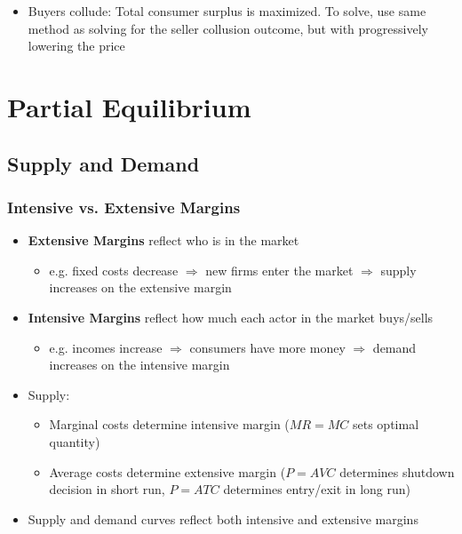 \documentclass{article}
\newcommand{\blue}[1]{{\color{blue}#1}}
\begin{document}
\begin{itemize}
\begin{itemize}
			\item Buyers collude: Total consumer surplus is maximized. To solve, use same method as solving for the seller collusion outcome, but with progressively lowering the price
		\end{itemize}
\end{itemize}

\pagebreak
\section{Partial Equilibrium}



\subsection{Supply and Demand}
\subsubsection{Intensive vs. Extensive Margins}
\begin{itemize}
	\item \textbf{Extensive Margins} reflect who is in the market
		\begin{itemize}
			\item e.g. fixed costs decrease $\Rightarrow$ new firms enter the market $\Rightarrow$ supply increases on the extensive margin
		\end{itemize}
	\item \textbf{Intensive Margins} reflect how much each actor in the market buys/sells
		\begin{itemize}
			\item e.g. incomes increase $\Rightarrow$ consumers have more money $\Rightarrow$ demand increases on the intensive margin
		\end{itemize}
	\item \blue{Supply:}
		\begin{itemize}
			\item Marginal costs determine intensive margin ($MR = MC$ sets optimal quantity)
			\item Average costs determine extensive margin ($P=AVC$ determines shutdown decision in short run, $P=ATC$ determines entry/exit in long run)
		\end{itemize}
	\item Supply and demand curves reflect \blue{both} intensive and extensive margins
\end{itemize}
\end{document}
